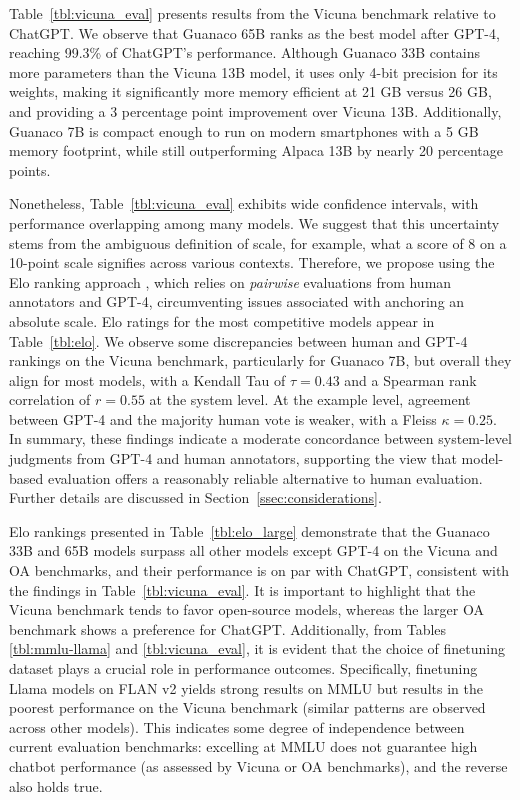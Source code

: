 Table~\ref{tbl:vicuna_eval} presents results from the Vicuna benchmark \cite{vicuna2023} relative to ChatGPT. We observe that {Guanaco} 65B ranks as the best model after GPT-4, reaching 99.3\% of ChatGPT’s performance. Although {Guanaco} 33B contains more parameters than the Vicuna 13B model, it uses only 4-bit precision for its weights, making it significantly more memory efficient at 21 GB versus 26 GB, and providing a 3 percentage point improvement over Vicuna 13B. Additionally, {Guanaco} 7B is compact enough to run on modern smartphones with a 5 GB memory footprint, while still outperforming Alpaca 13B by nearly 20 percentage points.

Nonetheless, Table~\ref{tbl:vicuna_eval} exhibits wide confidence intervals, with performance overlapping among many models. We suggest that this uncertainty stems from the ambiguous definition of scale, for example, what a score of 8 on a 10-point scale signifies across various contexts. Therefore, we propose using the Elo ranking approach \citep{elo1967proposed}, which relies on \textit{pairwise} evaluations from human annotators and GPT-4, circumventing issues associated with anchoring an absolute scale. Elo ratings for the most competitive models appear in Table~\ref{tbl:elo}. We observe some discrepancies between human and GPT-4 rankings on the Vicuna benchmark, particularly for Guanaco 7B, but overall they align for most models, with a Kendall Tau of $\tau=0.43$ and a Spearman rank correlation of $r=0.55$ at the system level. At the example level, agreement between GPT-4 and the majority human vote is weaker, with a Fleiss $\kappa=0.25$. In summary, these findings indicate a moderate concordance between system-level judgments from GPT-4 and human annotators, supporting the view that model-based evaluation offers a reasonably reliable alternative to human evaluation. Further details are discussed in Section~\ref{ssec:considerations}.

Elo rankings presented in Table~\ref{tbl:elo_large} demonstrate that the {Guanaco} 33B and 65B models surpass all other models except GPT-4 on the Vicuna and OA benchmarks, and their performance is on par with ChatGPT, consistent with the findings in Table~\ref{tbl:vicuna_eval}. It is important to highlight that the Vicuna benchmark tends to favor open-source models, whereas the larger OA benchmark shows a preference for ChatGPT. Additionally, from Tables \ref{tbl:mmlu-llama} and \ref{tbl:vicuna_eval}, it is evident that the choice of finetuning dataset plays a crucial role in performance outcomes. Specifically, finetuning Llama models on FLAN v2 yields strong results on MMLU but results in the poorest performance on the Vicuna benchmark (similar patterns are observed across other models). This indicates some degree of independence between current evaluation benchmarks: excelling at MMLU does not guarantee high chatbot performance (as assessed by Vicuna or OA benchmarks), and the reverse also holds true.

